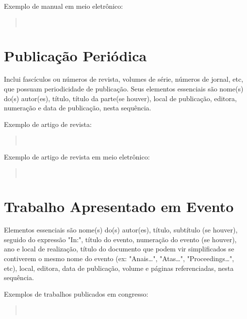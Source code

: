 \documentclass[repeatfields,xlists,xpacks,oneside,yearsonly]{ufrgscca}
\begin{document}
\begin{appendix}
Exemplo de manual em meio eletrônico:\\

\begin{quote}\noindent{}\\\end{quote}


\section{Publicação Periódica}

Inclui fascículos ou números de revista, volumes de série, números de
jornal, etc, que possuam periodicidade de publicação. Seus elementos
essenciais são nome(s) do(s) autor(es), título, título da parte(se houver),
local de publicação, editora, numeração e data de publicação, nesta
sequência.

Exemplo de artigo de revista:\\

\begin{quote}\noindent{}\\\end{quote}

Exemplo de artigo de revista em meio eletrônico:\\

\begin{quote}\noindent{}\\\end{quote}



\section{Trabalho Apresentado em Evento}

Elementos essenciais são nome(s) do(s) autor(es), título, subtítulo (se
houver), seguido do expressão "In:", título do evento, numeração do evento
(se houver), ano e local de realização, título do documento que podem vir
simplificados se contiverem o mesmo nome do evento (ex: "Anais\ldots",
"Atas\ldots", "Proceedings\ldots", etc), local, editora, data de publicação,
volume e páginas referenciadas, nesta sequência.

Exemplos de trabalhos publicados em congresso:\\

\begin{quote}\noindent{}\\\end{quote}


\end{appendix}
\end{document}
